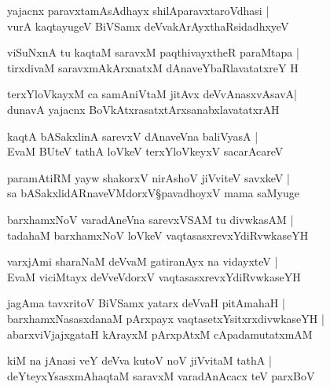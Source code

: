 \begin{shloka}
yajacnx paravxtamAsAdhayx shilAparavxtaroVdhasi |\\
vurA kaqtayugeV BiVSamx deVvakArAyxthaRsidadhxyeV
\end{shloka}

\begin{shloka}
viSuNxnA tu kaqtaM saravxM paqthivayxtheR paraMtapa |\\
tirxdivaM saravxmAkArxnatxM dAnaveYbaRlavatatxreY H
\end{shloka}

\begin{shloka}
terxYloVkayxM ca samAniVtaM jitAvx deVvAnasxvAsavA\R |\\
dunavA yajacnx BoVkAtxrasatxtArxsanabxlavatatxrAH 
\end{shloka}

\begin{shloka}
kaqtA bASakxlinA sarevxV dAnaveVna baliVyasA |\\
EvaM BUteV tathA loVkeV terxYloVkeyxV sacarAcareV
\end{shloka}

\begin{shloka}
paramAtiRM yayw shakorxV nirAshoV jiVviteV savxkeV |\\
sa bASakxlidARnaveVMdorxV\S pavadhoyxV mama saMyuge
\end{shloka}

\begin{shloka}
barxhamxNoV varadAneVna sarevxVSAM tu divwkasAM |\\
tadahaM barxhamxNoV loVkeV vaqtasasxrevxYdiRvwkaseYH
\end{shloka}

\begin{shloka}
varxjAmi sharaNaM deVvaM gatiranAyx na vidayxteV |\\
EvaM viciMtayx deVveVdorxV vaqtasasxrevxYdiRvwkaseYH
\end{shloka}

\begin{shloka}
jagAma tavxritoV BiVSamx yatarx deVvaH pitAmahaH |\\
barxhamxNasasxdanaM pArxpayx vaqtasetxYsitxrxdivwkaseYH |\\
abarxviVjajxgataH kArayxM pArxpAtxM cApadamutatxmAM 
\end{shloka}

\begin{shloka}
kiM na jAnasi veY deVva kutoV noV jiVvitaM tathA |\\
deYteyxYsasxmAhaqtaM saravxM varadAnAcacx teV parxBoV
\end{shloka}

